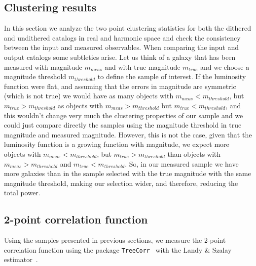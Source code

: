 \documentclass[\docopts]{\docclass}
\begin{document}
\subsection{Clustering results}
\label{sec:results}

In this section we analyze the two point clustering statistics for both the dithered and undithered catalogs in real and harmonic space and check the consistency between the input and measured observables. When comparing the input and output catalogs some subtleties arise. Let us think of a galaxy that has been measured with magnitude $m_{meas}$ and with true magnitude $m_{true}$ and we choose a magnitude threshold $m_{threshold}$ to define the sample of interest. If the luminosity function were flat, and assuming that the errors in magnitude are symmetric (which is not true) we would have as many objects with $m_{meas}<m_{threshold}$, but $m_{true}>m_{threshold}$ as objects with $m_{meas}>m_{threshold}$ but $m_{true}<m_{threshold}$, and this wouldn't change very much the clustering properties of our sample and we could just compare directly the samples using the magnitude threshold in true magnitude and measured magnitude. However, this is not the case, given that the luminosity function is a growing function with magnitude, we expect more objects with $m_{meas}<m_{threshold}$, but $m_{true}>m_{threshold}$ than objects with $m_{meas}>m_{threshold}$ and $m_{true}<m_{threshold}$. So, in our measured sample we have more galaxies than in the sample selected with the true magnitude with the same magnitude threshold, making our selection wider, and therefore, reducing the total power.
\subsection{2-point correlation function}
Using the samples presented in previous sections, we measure the 2-point correlation function using the package \texttt{TreeCorr}~\citep{2004MNRAS.352..338J} with the Landy \& Szalay estimator~\citep{1993ApJ...412...64L}.
\end{document}
